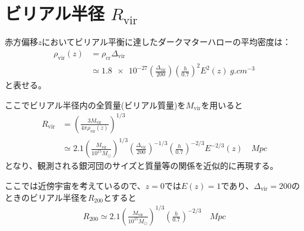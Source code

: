 \section{ビリアル半径 $R_\text{vir}$}

赤方偏移$z$においてビリアル平衡に達したダークマターハローの平均密度は：
\begin{align}
	\rho_\text{vir}(z) &= \rho_\text{cr} \Delta_\text{vir} \\
	&\simeq \num{1.8e-27} \left( \frac{\Delta_\text{vir}}{200}\right) \left(\frac{h}{0.7}\right)^2 E^2(z) \ \si{g. cm^{-3}}
\end{align}
と表せる。

ここでビリアル半径内の全質量(ビリアル質量)を$M_\text{vir}$を用いると
\begin{align}
	R_\text{vir} &= \left( \frac{3 M_\text{vir}}{4 \pi \rho_\text{vir}(z)} \right)^{1/3} \\
	&\simeq 2.1 \left( \frac{M_\text{vir}}{10^{15} M_\odot} \right)^{1/3} \left( \frac{\Delta_\text{vir}}{200} \right)^{-1/3} \left( \frac{h}{0.7} \right)^{-2/3} E^{-2/3}(z) \quad \si{Mpc}
\end{align}
となり、観測される銀河団のサイズと質量等の関係を近似的に再現する。

ここでは近傍宇宙を考えているので、$z=0$では$E(z) = 1$であり、$\Delta_\text{vir} = 200$のときのビリアル半径を$R_{200}$とすると
\begin{align}
	R_{200} \simeq 2.1 \left( \frac{M_\text{vir}}{10^{15} M_\odot} \right)^{1/3} \left( \frac{h}{0.7} \right)^{-2/3} \quad \si{Mpc}
\end{align}

%	
%	
%	
%	
%	
%	

